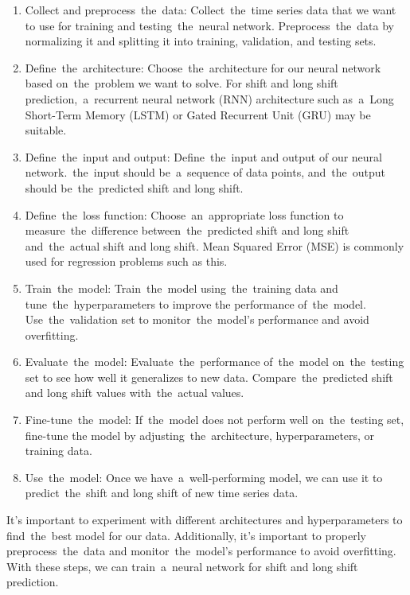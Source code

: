         \begin{enumerate}
            \item Collect and preprocess~the~data: Collect~the~time series data that we want to use for training and
            testing~the~neural network. Preprocess~the~data by normalizing it and splitting it into training,
            validation, and testing sets.
            \item Define~the~architecture: Choose~the~architecture for our neural network based on~the~problem we
            want to solve. For shift and long shift prediction,~a~recurrent neural network (RNN) architecture
            such as~a~Long Short-Term Memory (LSTM) or Gated Recurrent Unit (GRU) may be suitable.
            \item Define~the~input and output: Define~the~input and output of our neural network.~the~input
            should be~a~sequence of data points, and~the~output should be~the~predicted shift and long shift.
            \item Define~the~loss function: Choose~an~appropriate loss function to measure~the~difference
            between~the~predicted shift and long shift and~the~actual shift and long shift. Mean Squared Error (MSE) is
            commonly used for regression problems such as this.
            \item Train~the~model: Train~the~model using~the~training data and tune~the~hyperparameters to improve the
            performance of~the~model. Use~the~validation set to monitor~the~model's performance and avoid overfitting.
            \item Evaluate~the~model: Evaluate~the~performance of~the~model on~the~testing set to see how well it
            generalizes to new data. Compare~the~predicted shift and long shift values with~the~actual values.
            \item Fine-tune~the~model: If~the~model does not perform well on~the~testing set, fine-tune the
            model by adjusting~the~architecture, hyperparameters, or training data.
            \item Use~the~model: Once we have~a~well-performing model, we can use it to predict~the~shift and long
            shift of new time series data.
        \end{enumerate}
        It's important to experiment with different architectures and hyperparameters to find~the~best model for
        our data. Additionally, it's important to properly preprocess~the~data and monitor~the~model's performance
        to avoid overfitting. With these steps, we can train~a~neural network for shift and long shift prediction.\\
